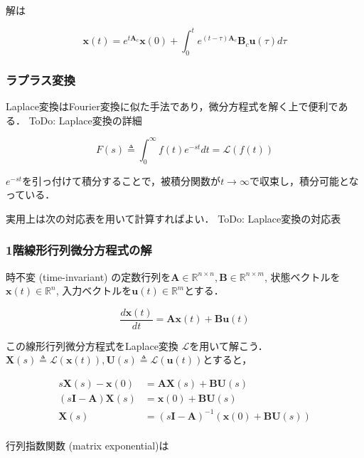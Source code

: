 解は


\begin{equation}
\mathbf{x}(t)=e^{t\mathbf{A}_c}\mathbf{x}(0)+\int_0^t e^{(t-\tau)\mathbf{A}_c}\mathbf{B}_c\mathbf{u}(\tau) d\tau
\end{equation}
\subsubsection{ラプラス変換}

Laplace変換はFourier変換に似た手法であり，微分方程式を解く上で便利である．
ToDo: Laplace変換の詳細


\begin{equation}
F(s)\triangleq\int_0^{\infty} f(t) e^{-st} dt=\mathcal{L}(f(t))
\end{equation}


$e^{-st}$を引っ付けて積分することで，被積分関数が$t\to \infty$で収束し，積分可能となっている．

実用上は次の対応表を用いて計算すればよい．
ToDo: Laplace変換の対応表
\subsubsection{1階線形行列微分方程式の解}
時不変 (time-invariant) の定数行列を$\mathbf{A} \in \mathbb{R}^{n\times n}, \mathbf{B} \in \mathbb{R}^{n\times m}$, 状態ベクトルを$\mathbf{x}(t)\in\mathbb{R}^n$, 入力ベクトルを$\mathbf{u}(t)\in\mathbb{R}^m$とする．


\begin{equation}
\frac{d\mathbf{x}(t)}{dt} = \mathbf{A}\mathbf{x}(t) + \mathbf{B}\mathbf{u}(t)
\end{equation}


この線形行列微分方程式をLaplace変換 $\mathcal{L}$を用いて解こう．$\boldsymbol{X}(s) \triangleq \mathcal{L}(\mathbf{x}(t)), \boldsymbol{U}(s) \triangleq \mathcal{L}(\mathbf{u}(t))$とすると，


\begin{align}
s\boldsymbol{X}(s) - \mathbf{x}(0) &= \mathbf{A}\boldsymbol{X}(s)+ \mathbf{B}\boldsymbol{U}(s)\\
(s\mathbf{I} - \mathbf{A}) \boldsymbol{X}(s) &= \mathbf{x}(0) + \mathbf{B}\boldsymbol{U}(s)\\
\boldsymbol{X}(s) &= (s\mathbf{I} - \mathbf{A})^{-1}(\mathbf{x}(0) + \mathbf{B}\boldsymbol{U}(s))\\
\end{align}


行列指数関数 (matrix exponential)は


